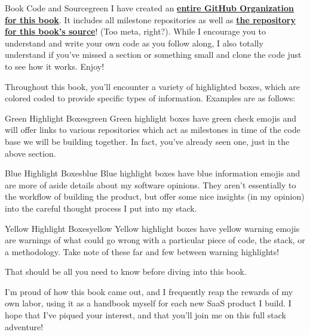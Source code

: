\documentclass[a4paper,
                             oneside,
                             BCOR1.0cm,
                             DIV11,
                             parskip=full,
                             11pt]{scrbook}
\newcommand{\link}[2]{\textbf{\textcolor{monokaiPink}{\href{#2}{#1}}}}
\begin{document}

\begin{highlightBox}{Book Code and Source}{green}{\greenCheck}
I have created an \link{entire GitHub Organization for this book}{https://github.com/Full-Stack-SaaS-Product-Cookbook}. It includes all milestone repositories as well as \link{the repository for this book's source}{https://github.com/Full-Stack-SaaS-Product-Cookbook/full-stack-saas-product-cookbook}! (Too meta, right?). While I encourage you to understand and write your own code as you follow along, I also totally understand if you've missed a section or something small and clone the code just to see how it works. Enjoy!
\end{highlightBox}


Throughout this book, you'll encounter a variety of highlighted boxes, which are colored coded to provide specific types of information. Examples are as follows:

\begin{highlightBox}{Green Highlight Boxes}{green}{\greenCheck}
Green highlight boxes have green check emojis and will offer links to various repositories which act as milestones in time of the code base we will be building together. In fact, you've already seen one, just in the above section.
\end{highlightBox}

\begin{highlightBox}{Blue Highlight Boxes}{blue}{\information}
Blue highlight boxes have blue information emojis and are more of aside details about my software opinions. They aren't essentially to the workflow of building the product, but offer some nice insights (in my opinion) into the careful thought process I put into my stack.
\end{highlightBox}

\begin{highlightBox}{Yellow Highlight Boxes}{yellow}{\warning}
Yellow highlight boxes have yellow warning emojis are warnings of what could go wrong with a particular piece of code, the stack, or a methodology. Take note of these far and few between warning highlights!
\end{highlightBox}


That should be all you need to know before diving into this book.

I'm proud of how this book came out, and I frequently reap the rewards of my own labor, using it as a handbook myself for each new SaaS product I build. I hope that I've piqued your interest, and that you'll join me on this full stack adventure!
\end{document}
